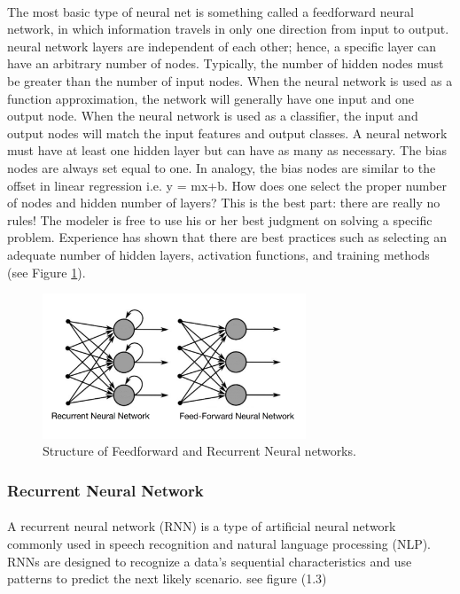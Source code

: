 \paragraph{}The most basic type of neural net is something called a feedforward neural network, in which information travels in only one direction from input to output.\newline
neural network layers are independent of each other; hence, a specific layer can have an arbitrary number of nodes. Typically, the number of hidden nodes must be greater than the number of input nodes. When the neural network is used as a function approximation, the network will generally have one input and one output node. When the neural network is used as a classifier, the input and output nodes will match the input features and output classes.\newline
A neural network must have at least one hidden layer but can have as many as necessary. The bias nodes are always set equal to one. In analogy, the bias nodes are similar to the offset in linear regression 
i.e. y = mx+b. How does one select the proper number of nodes and hidden number of layers? This is the best part: there are really no rules! The modeler is free to use his or her best judgment on solving a specific problem. Experience has shown that there are best practices such as selecting an adequate number of hidden layers, activation functions, and training methods (see Figure \ref{feed_forwoard}).
\begin{figure}[H]
	\centering
	\includegraphics[width=0.7\textwidth]{rf.png}
	\caption{Structure of Feedforward and Recurrent Neural networks.}
	\label{feed_forwoard}
\end{figure}
\subsubsection{Recurrent Neural Network
}
\paragraph{}
A recurrent neural network (RNN) is a type of artificial neural network commonly used in speech recognition and natural language processing (NLP). RNNs are designed to recognize a data's sequential characteristics and use patterns to predict the next likely scenario. see figure (1.3) 
